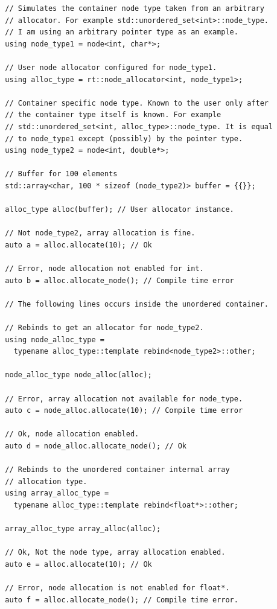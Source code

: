 \documentclass[11pt]{article}
\begin{document}
\medskip
\begin{lstlisting}
  // Simulates the container node type taken from an arbitrary
  // allocator. For example std::unordered_set<int>::node_type.
  // I am using an arbitrary pointer type as an example.
  using node_type1 = node<int, char*>;

  // User node allocator configured for node_type1.
  using alloc_type = rt::node_allocator<int, node_type1>;

  // Container specific node type. Known to the user only after
  // the container type itself is known. For example
  // std::unordered_set<int, alloc_type>::node_type. It is equal
  // to node_type1 except (possibly) by the pointer type.
  using node_type2 = node<int, double*>;

  // Buffer for 100 elements
  std::array<char, 100 * sizeof (node_type2)> buffer = {{}};

  alloc_type alloc(buffer); // User allocator instance.

  // Not node_type2, array allocation is fine.
  auto a = alloc.allocate(10); // Ok

  // Error, node allocation not enabled for int.
  auto b = alloc.allocate_node(); // Compile time error

  // The following lines occurs inside the unordered container.

  // Rebinds to get an allocator for node_type2.
  using node_alloc_type =
    typename alloc_type::template rebind<node_type2>::other;

  node_alloc_type node_alloc(alloc);

  // Error, array allocation not available for node_type.
  auto c = node_alloc.allocate(10); // Compile time error

  // Ok, node allocation enabled.
  auto d = node_alloc.allocate_node(); // Ok

  // Rebinds to the unordered container internal array
  // allocation type. 
  using array_alloc_type =
    typename alloc_type::template rebind<float*>::other;

  array_alloc_type array_alloc(alloc);

  // Ok, Not the node type, array allocation enabled.
  auto e = alloc.allocate(10); // Ok

  // Error, node allocation is not enabled for float*.
  auto f = alloc.allocate_node(); // Compile time error.
\end{lstlisting}
\end{document}
